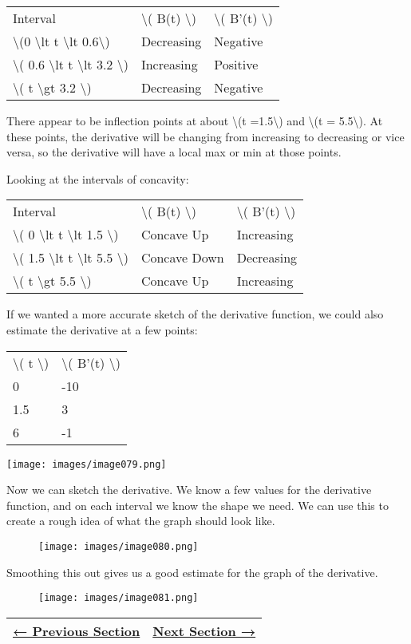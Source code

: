 \begin{longtable}[]{@{}lll@{}}
\toprule
\endhead
Interval & \textbackslash{}( B(t) \textbackslash{}) & \textbackslash{}(
B'(t) \textbackslash{})\tabularnewline
\textbackslash{}(0 \textbackslash{}lt t \textbackslash{}lt
0.6\textbackslash{}) & Decreasing & Negative\tabularnewline
\textbackslash{}( 0.6 \textbackslash{}lt t \textbackslash{}lt 3.2
\textbackslash{}) & Increasing & Positive\tabularnewline
\textbackslash{}( t \textbackslash{}gt 3.2 \textbackslash{}) &
Decreasing & Negative\tabularnewline
\bottomrule
\end{longtable}

There appear to be inflection points at about \textbackslash{}(t
=1.5\textbackslash{}) and \textbackslash{}(t = 5.5\textbackslash{}). At
these points, the derivative will be changing from increasing to
decreasing or vice versa, so the derivative will have a local max or min
at those points.

Looking at the intervals of concavity:

\begin{longtable}[]{@{}lll@{}}
\toprule
\endhead
Interval & \textbackslash{}( B(t) \textbackslash{}) & \textbackslash{}(
B'(t) \textbackslash{})\tabularnewline
\textbackslash{}( 0 \textbackslash{}lt t \textbackslash{}lt 1.5
\textbackslash{}) & Concave Up & Increasing\tabularnewline
\textbackslash{}( 1.5 \textbackslash{}lt t \textbackslash{}lt 5.5
\textbackslash{}) & Concave Down & Decreasing\tabularnewline
\textbackslash{}( t \textbackslash{}gt 5.5 \textbackslash{}) & Concave
Up & Increasing\tabularnewline
\bottomrule
\end{longtable}

If we wanted a more accurate sketch of the derivative function, we could
also estimate the derivative at a few points:

\begin{longtable}[]{@{}ll@{}}
\toprule
\endhead
\textbackslash{}( t \textbackslash{}) & \textbackslash{}( B'(t)
\textbackslash{})\tabularnewline
0 & -10\tabularnewline
1.5 & 3\tabularnewline
6 & -1\tabularnewline
\bottomrule
\end{longtable}

\texttt{[image: images/image079.png]}

Now we can sketch the derivative. We know a few values for the
derivative function, and on each interval we know the shape we need. We
can use this to create a rough idea of what the graph should look like.

\begin{figure}
\centering
\texttt{[image: images/image080.png]}
\caption{}
\end{figure}

Smoothing this out gives us a good estimate for the graph of the
derivative.

\begin{figure}
\centering
\texttt{[image: images/image081.png]}
\caption{}
\end{figure}

\begin{longtable}[]{@{}ll@{}}
\toprule
\endhead
\href{section2-7.php}{← Previous Section} & \href{section2-9.php}{Next
Section →}\tabularnewline
\bottomrule
\end{longtable}
